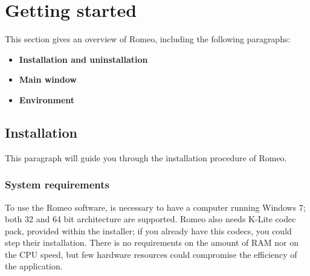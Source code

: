\section{Getting started}
\label{gettingstarted}
This section gives an overview of Romeo, including the following paragraphs:
\begin{itemize}
\item \textbf{Installation and uninstallation}
\item \textbf{Main window}
\item \textbf{Environment}
\end{itemize}

\subsection{Installation}
\label{installation}
This paragraph will guide you through the installation procedure of Romeo.

\subsubsection{System requirements}
\label{systemrequirements}
To use the Romeo software, is necessary to have a computer running Windows 7; both 32 and 64 bit architecture are supported. Romeo also needs K-Lite codec pack, provided within the installer; if you already have this codecs, you could step their installation. There is no requirements on the amount of RAM nor on the CPU speed, but few hardware resources could compromise the efficiency of the application.

